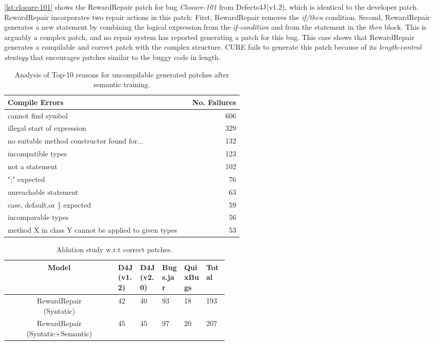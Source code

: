 \autoref{lst:closure-101} shows the RewardRepair patch for bug \textit{Closure-101} from Defects4J(v1.2), which is identical to the developer patch. RewardRepair incorporates two repair actions in this patch: First,  RewardRepair removes the \textit{if/then} condition. Second, RewardRepair generates a new statement by combining the logical expression from the \textit{if-condition} and from the statement in the \textit{then} block.  This is arguably a complex patch, and no repair system has reported generating a patch for this bug. This case shows that RewardRepair generates a compilable and correct patch with the complex structure. CURE fails to generate this patch because of its \textit{length-control strategy} that encourages patches similar to the buggy code in length. 

\begin{table}[t!]
\footnotesize
\renewcommand{\arraystretch}{1.28}
 \begin{tabular}{p{0.75\linewidth} r }
\hline
Compile Errors &No. Failures\\
\hline
cannot find symbol&606\\
illegal start of expression&329\\
no suitable method constructor found for...&132\\
incompatible types&123\\
not a statement&102\\
";" expected&76\\
unreachable statement&63\\
case, default,or \} expected&59\\
incomparable types&56\\
method X in class Y cannot be applied to given types&53\\
\hline

\end{tabular}
\caption{Analysis of Top-10 reasons for uncompilable generated patches after semantic training.}	
\label{tab:uncompilable-analysis}
\end{table}

\begin{table}[t!]
\footnotesize
\renewcommand{\arraystretch}{2.2}
\begin{tabular}{c p{0.1\linewidth}p{0.1\linewidth}p{0.1\linewidth}p{0.1\linewidth}p{0.1\linewidth}}

\hline
\textbf{Model} & \textbf{D4J(v1.2)} &\textbf{D4J(v2.0)}&\textbf{Bugs.jar}& \textbf{QuixBugs} & \textbf{Total} \\
\hline
\makecell{RewardRepair\\(Syntatic)} & 42 &  40 & 93  &18 & 193 \\

\makecell{RewardRepair\\(Syntatic+Semantic)} & 45 &45 & 97 & 20 & 207  \\
\hline

\end{tabular}
\caption{Ablation study w.r.t correct patches. }	
\label{tab:ablation}
\end{table}

